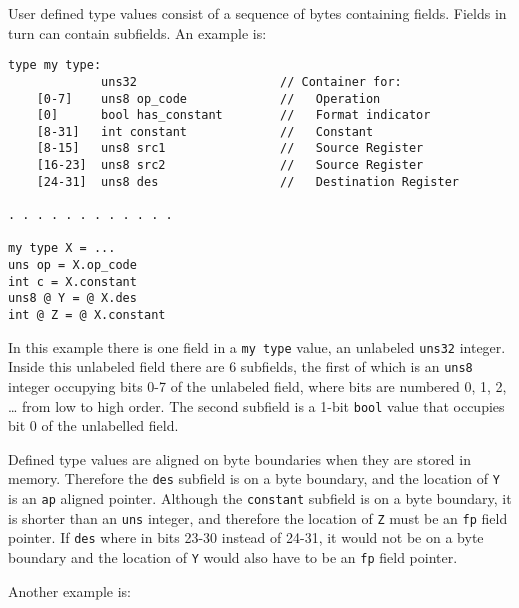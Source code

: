 \documentclass[12pt]{article}
\newenvironment{indpar}[1][0.3in]%
	{\begin{list}{}%
		     {\setlength{\itemsep}{0in}%
		      \setlength{\topsep}{0in}%
		      \setlength{\parsep}{1ex}%
		      \setlength{\labelwidth}{#1}%
		      \setlength{\leftmargin}{#1}%
		      \addtolength{\leftmargin}{\labelsep}}%
	 \item}%
	{\end{list}}
\begin{document}
User defined type values consist of a sequence of bytes containing fields.
Fields in turn can contain subfields.
An example is:

\begin{indpar}\begin{verbatim}
type my type:
             uns32                    // Container for:
    [0-7]    uns8 op_code             //   Operation
    [0]      bool has_constant        //   Format indicator
    [8-31]   int constant             //   Constant
    [8-15]   uns8 src1                //   Source Register
    [16-23]  uns8 src2                //   Source Register
    [24-31]  uns8 des                 //   Destination Register

. . . . . . . . . . . .

my type X = ...
uns op = X.op_code
int c = X.constant
uns8 @ Y = @ X.des
int @ Z = @ X.constant
\end{verbatim}\end{indpar}

In this example there is one field in a {\tt my type} value,
an unlabeled {\tt uns32} integer.
Inside this unlabeled field there are 6 subfields, the first of which is
an {\tt uns8} integer occupying bits 0-7 of the unlabeled field,
where bits are numbered 0, 1, 2, \ldots{} from
low to high order.  The second subfield is a 1-bit {\tt bool}
value that occupies bit 0 of the unlabelled field.

Defined type values are aligned on byte boundaries when
they are stored in memory.  Therefore the {\tt des} subfield
is on a byte boundary, and
the location of {\tt Y} is an {\tt ap} aligned pointer.  Although
the {\tt constant} subfield is on a byte boundary, it is
shorter than an {\tt uns} integer, and therefore the
location of {\tt Z} must be an {\tt fp} field pointer.
If {\tt des} where in bits 23-30 instead of 24-31, it would
not be on a byte boundary and the location of {\tt Y} would
also have to be an {\tt fp} field pointer.

Another example is:
\end{document}
